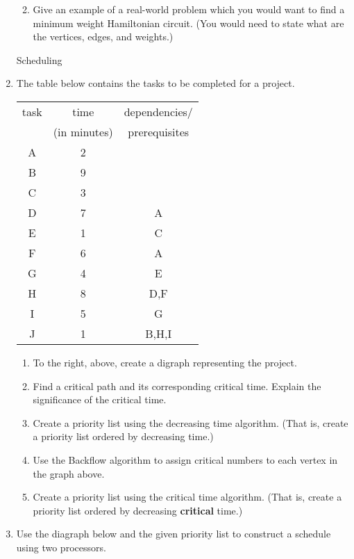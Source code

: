 \documentclass[12pt]{article}
\begin{document}
\begin{enumerate}
\begin{enumerate}
\hfill
{}
	\vfill
	\item Give an example of a real-world problem which you would want to find a minimum weight Hamiltonian circuit. (You would need to state what are the vertices, edges, and weights.)
	\vfill
	\end{enumerate}
\newpage
\begin{center} {\Large{Scheduling}} \end{center}
\item The table below contains the tasks to be completed for a project.\\
\begin{tabular}{| c|c|c|}
\hline
task& time& dependencies/\\
&(in minutes)&prerequisites\\
\hline
A&2&\\ \hline
B&9&\\ \hline
C&3&\\ \hline
D&7&A\\ \hline
E&1&C\\ \hline
F&6&A\\ \hline
G&4&E\\ \hline
H&8&D,F\\ \hline
I&5&G\\ \hline
J&1&B,H,I\\ \hline
\end{tabular}
	\begin{enumerate}
	\item To the right, above, create a digraph representing the project.
	\item Find a critical path and its corresponding critical time. Explain the significance of the critical time.
	\vfill
	\item Create a priority list using the decreasing time algorithm. (That is, create a priority list ordered by decreasing time.)
	\vfill
	\item Use the Backflow algorithm to assign critical numbers to each vertex in the graph above.
	\item Create a priority list using the critical time algorithm. (That is, create a priority list ordered by decreasing \textbf{critical} time.)
	\vfill
	\end{enumerate} 
\newpage
\item Use the diagraph below and the given priority list to construct a schedule using two processors.


\end{enumerate}
\end{document}
